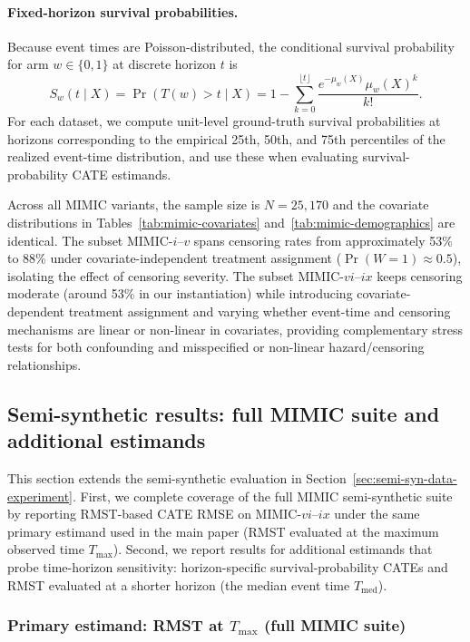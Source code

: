 \documentclass{article} %
\begin{document}
\paragraph{Fixed-horizon survival probabilities.}
Because event times are Poisson-distributed, the conditional survival probability for arm $w\in\{0,1\}$ at discrete horizon $t$ is
\[
S_w(t\mid X)=\Pr(T(w)>t\mid X)=1-\sum_{k=0}^{\lfloor t\rfloor}\frac{e^{-\mu_w(X)}\mu_w(X)^k}{k!}.
\]
For each dataset, we compute unit-level ground-truth survival probabilities at horizons corresponding to the empirical 25th, 50th, and 75th percentiles of the realized event-time distribution, and use these when evaluating survival-probability CATE estimands.



Across all MIMIC variants, the sample size is $N=25{,}170$ and the covariate distributions in Tables~\ref{tab:mimic-covariates} and~\ref{tab:mimic-demographics} are identical. The subset MIMIC-$i$--$v$ spans censoring rates from approximately 53\% to 88\% under covariate-independent treatment assignment ($\Pr(W{=}1)\approx 0.5$), isolating the effect of censoring severity. The subset MIMIC-$vi$--$ix$ keeps censoring moderate (around 53\% in our instantiation) while introducing covariate-dependent treatment assignment and varying whether event-time and censoring mechanisms are linear or non-linear in covariates, providing complementary stress tests for both confounding and misspecified or non-linear hazard/censoring relationships.

\clearpage
\subsection{Semi-synthetic results: full MIMIC suite and additional estimands}
\label{app:other-estimand-result}

This section extends the semi-synthetic evaluation in Section~\ref{sec:semi-syn-data-experiment}. First, we complete coverage of the full MIMIC semi-synthetic suite by reporting RMST-based CATE RMSE on MIMIC-$vi$--$ix$ under the same primary estimand used in the main paper (RMST evaluated at the maximum observed time $T_{\max}$). Second, we report results for additional estimands that probe time-horizon sensitivity: horizon-specific survival-probability CATEs and RMST evaluated at a shorter horizon (the median event time $T_{\text{med}}$).


\subsubsection{Primary estimand: RMST at $T_{\max}$ (full MIMIC suite)}
\label{app:semi-syn-rmst-tmax}
\end{document}
